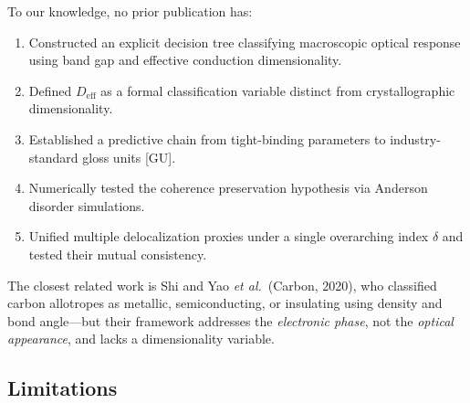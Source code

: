 \documentclass[twocolumn,showpacs,preprintnumbers,amsmath,amssymb,prb]{revtex4-2}
\begin{document}
To our knowledge, no prior publication has:
\begin{enumerate}
  \item Constructed an explicit decision tree classifying macroscopic
    optical response using band gap and effective conduction
    dimensionality.
  \item Defined $D_\mathrm{eff}$ as a formal classification variable
    distinct from crystallographic dimensionality.
  \item Established a predictive chain from tight-binding parameters
    to industry-standard gloss units [GU].
  \item Numerically tested the coherence preservation hypothesis via
    Anderson disorder simulations.
  \item Unified multiple delocalization proxies under a single
    overarching index $\delta$ and tested their mutual consistency.
\end{enumerate}

The closest related work is Shi and Yao \textit{et al.}\ (Carbon, 2020),
who classified carbon allotropes as metallic, semiconducting, or
insulating using density and bond angle---but their framework addresses
the \emph{electronic phase}, not the \emph{optical appearance}, and
lacks a dimensionality variable.

\subsection{Limitations}
\end{document}
